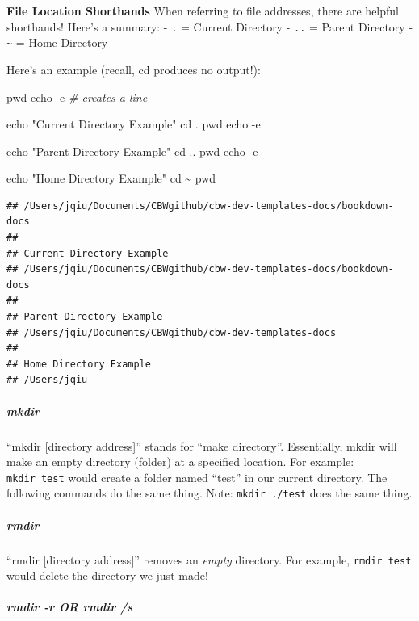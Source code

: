 \documentclass[
]{book}
\newenvironment{Shaded}{\begin{snugshade}}{\end{snugshade}}
\newcommand{\AttributeTok}[1]{\textcolor[rgb]{0.13,0.29,0.53}{#1}}
\newcommand{\BuiltInTok}[1]{#1}
\newcommand{\CommentTok}[1]{\textcolor[rgb]{0.56,0.35,0.01}{\textit{#1}}}
\newcommand{\NormalTok}[1]{#1}
\newcommand{\StringTok}[1]{\textcolor[rgb]{0.31,0.60,0.02}{#1}}
\theoremstyle{definition}
\theoremstyle{definition}
\theoremstyle{definition}
\theoremstyle{definition}
\theoremstyle{remark}
\begin{document}
\textbf{File Location Shorthands}
When referring to file addresses, there are helpful shorthands! Here's a summary:
- \texttt{.} = Current Directory
- \texttt{..} = Parent Directory
- \texttt{\textasciitilde{}} = Home Directory

Here's an example (recall, cd produces no output!):

\begin{Shaded}
\begin{Highlighting}[]
\BuiltInTok{pwd}
\BuiltInTok{echo} \AttributeTok{{-}e} \CommentTok{\# creates a line}

\BuiltInTok{echo} \StringTok{"Current Directory Example"}
\BuiltInTok{cd}\NormalTok{ .}
\BuiltInTok{pwd}
\BuiltInTok{echo} \AttributeTok{{-}e}

\BuiltInTok{echo} \StringTok{"Parent Directory Example"}
\BuiltInTok{cd}\NormalTok{ ..}
\BuiltInTok{pwd}
\BuiltInTok{echo} \AttributeTok{{-}e}

\BuiltInTok{echo} \StringTok{"Home Directory Example"}
\BuiltInTok{cd}\NormalTok{ \textasciitilde{}}
\BuiltInTok{pwd}
\end{Highlighting}
\end{Shaded}

\begin{verbatim}
## /Users/jqiu/Documents/CBWgithub/cbw-dev-templates-docs/bookdown-docs
## 
## Current Directory Example
## /Users/jqiu/Documents/CBWgithub/cbw-dev-templates-docs/bookdown-docs
## 
## Parent Directory Example
## /Users/jqiu/Documents/CBWgithub/cbw-dev-templates-docs
## 
## Home Directory Example
## /Users/jqiu
\end{verbatim}

\subparagraph*{mkdir}\label{mkdir}

``mkdir {[}directory address{]}'' stands for ``make directory''. Essentially, mkdir will make an empty directory (folder) at a specified location. For example: \texttt{mkdir\ test} would create a folder named ``test'' in our current directory. The following commands do the same thing. Note: \texttt{mkdir\ ./test} does the same thing.

\subparagraph*{rmdir}\label{rmdir}

``rmdir {[}directory address{]}'' removes an \emph{empty} directory. For example, \texttt{rmdir\ test} would delete the directory we just made!

\subparagraph*{rmdir -r OR rmdir /s}\label{rmdir--r-or-rmdir-s}
\end{document}
